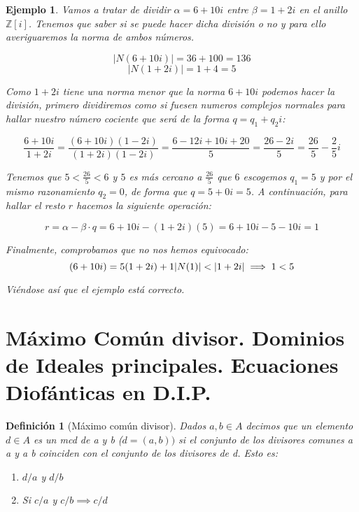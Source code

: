 \documentclass[11pt, a4paper, titlepage]{article}
\providecommand{\ent}{\mathbb{Z}}
\providecommand{\abs}[1]{\lvert#1\rvert}
\theoremstyle{theorem-style}
\theoremstyle{definition-style}
\newtheorem*{ndef}{Definición}
\theoremstyle{remark-style}
\theoremstyle{example-style}
\newtheorem*{ejemplo}{Ejemplo}
\newenvironment{nlist}
{\begin{enumerate}
\renewcommand\labelenumi{(\emph{\roman{enumi})}}}
{\end{enumerate}}
\begin{document}
\begin{ejemplo}
Vamos a tratar de dividir $\alpha=6+10i$ entre $\beta=1+2i$ en el anillo $\ent[i]$. Tenemos que saber si se puede hacer dicha división o no y para ello averiguaremos la norma de ambos números.

$$\abs{N(6+10i)}=36+100=136$$
$$\abs{N(1+2i)}=1+4=5$$

Como $1+2i$ tiene una norma menor que la norma $6+10i$ podemos hacer la división, primero dividiremos como si fuesen numeros complejos normales para hallar nuestro número cociente que será de la forma $q=q_1+q_2i$:

\[
	\frac{6+10i}{1+2i}=\frac{(6+10i)(1-2i)}{(1+2i)(1-2i)}=\frac{6-12i+10i+20}{5}=\frac{26-2i}{5}=\frac{26}{5}-\frac{2}{5}i
\]

Tenemos que $5<\frac{26}{5}<6$ y $5$ es más cercano a $\frac{26}{5}$ que $6$ escogemos $q_1=5$ y por el mismo razonamiento $q_2=0$, de forma que $q=5+0i=5$. A continuación, para hallar el resto $r$ hacemos la siguiente operación:

\[
	r=\alpha-\beta \cdot q = 6+10i - (1+2i)(5)=6+10i-5-10i=1
\]

Finalmente, comprobamos que no nos hemos equivocado:
\[
	(6+10i)=5(1+2i)+1\\
	\abs{N(1)}<\abs{1+2i} \implies 1<5
\]

Viéndose así que el ejemplo está correcto.

\end{ejemplo}

\section{Máximo Común divisor. Dominios de Ideales principales. Ecuaciones Diofánticas en D.I.P.}


\begin{ndef}[Máximo común divisor]

Dados $a,b \in A$ decimos que un elemento $d\in A$ es un mcd de a y b ($d=(a,b))$ si el conjunto de los divisores comunes a a y a b coinciden con el conjunto de los divisores de d. Esto es:

\begin{nlist}
	\item $d/a$ y $d/b$
	\item Si $c/a$ y $c/b \implies c/d$ 
\end{nlist} 
	
\end{ndef}
\end{document}
